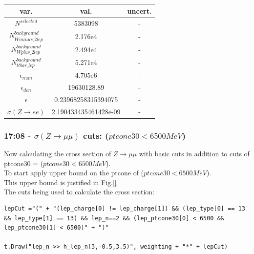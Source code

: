 \begin{tabular}{ | c | c | c |}
  \hline			
  var. & val. & uncert. \\
  \hline 
  
  $N^{selected}$ & 5383098 & - \\
  
  $N^{background}_{Wminus\_2lep}$ & 2.176e4 & - \\
  
  $N^{background}_{Wplus\_2lep}$ & 2.494e4 & - \\
  
  $N^{background}_{ttbar\_lep}$ & 5.271e4 & - \\
  
  $\epsilon_{num}$ & 4.705e6 & - \\
  
  $\epsilon_{den}$ & 19630128.89 & - \\
  \hline  
  $\epsilon$ & 0.23968258315394075 & - \\
  $\sigma(Z \rightarrow ee)$ & 2.190433435461428e-09 & - \\
  \hline  
\end{tabular}

\subsubsection*{17:08 - $\sigma(Z \rightarrow \mu\mu)$ cuts: ($  ptcone30 < 6500 MeV $)}
Now calculating the cross section of $Z \rightarrow \mu\mu$ with basic cuts in addition to cuts of ptcone30 = ($  ptcone30 < 6500 MeV $).
\\
To start apply upper bound on the ptcone of ($ ptcone30 < 6500 MeV $).
\\
This upper bound is justified in Fig.\ref{}
\\
The cuts being used to calculate the cross section:
\begin{lstlisting}
lepCut ="(" + "(lep_charge[0] != lep_charge[1]) && (lep_type[0] == 13 && lep_type[1] == 13) && lep_n==2 && (lep_ptcone30[0] < 6500 && lep_ptcone30[1] < 6500)" + ")"    
  
t.Draw("lep_n >> h_lep_n(3,-0.5,3.5)", weighting + "*" + lepCut)
\end{lstlisting}

